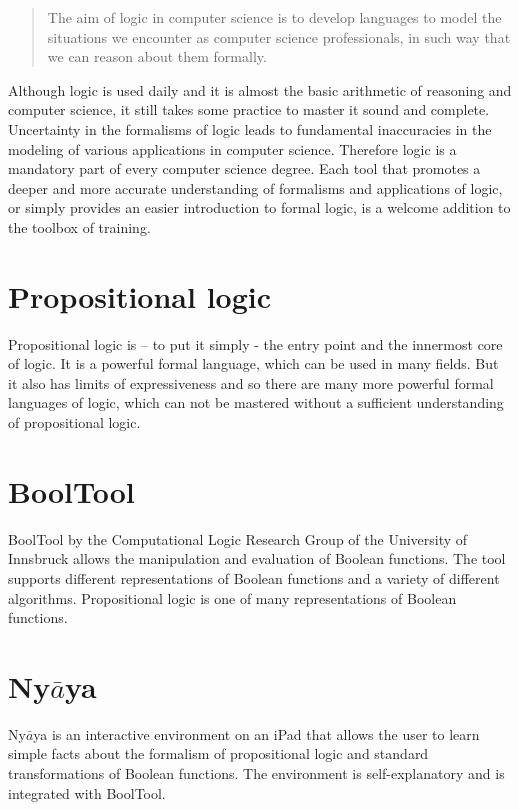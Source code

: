 
\begin{quote}
The aim of logic in computer science is to develop languages 
to model the situations we encounter as computer science professionals, 
in such way that we can reason about them formally. \cite{Huth:2004:LCS:975331}
\end{quote}

Although logic is used daily and it is almost the basic arithmetic of reasoning and computer science, 
it still takes some practice to master it sound and complete. 
Uncertainty in the formalisms of logic leads to fundamental inaccuracies 
in the modeling of various applications in computer science. 
Therefore logic is a mandatory part of every computer science degree. 
Each tool that promotes a deeper and more accurate understanding of formalisms and applications of logic,
or simply provides an easier introduction to formal logic, 
is a welcome addition to the toolbox of training.

\section{Propositional logic}

Propositional logic is – to put it simply - the entry point and the innermost core of logic. 
It is a powerful formal language, which can be used in many fields. 
But it also has limits of expressiveness and so 
there are many more powerful formal languages of logic, 
which can not be mastered without a sufficient understanding  of propositional logic.

\section{BoolTool}

BoolTool by the Computational Logic Research Group of the University of Innsbruck allows the manipulation and evaluation of Boolean functions. The tool supports different representations of Boolean functions and a variety of different algorithms.
Propositional logic is one of many representations of Boolean functions.

\section{Ny$\bar{a}$ya}

Ny$\bar{a}$ya is an interactive environment on an iPad that allows the user to learn simple facts about the formalism of propositional logic and standard transformations of Boolean functions. The environment is self-explanatory and is integrated with BoolTool. 


%
